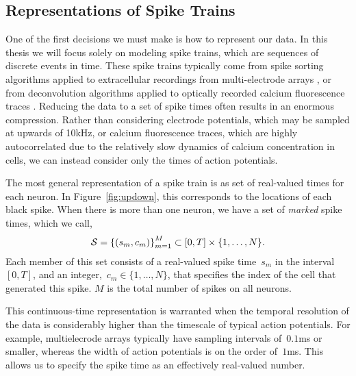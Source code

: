 \subsection{Representations of Spike Trains}
One of the first decisions we must make is how to
represent our data. In this thesis we will focus solely on modeling
spike trains, which are sequences of discrete events in time. These
spike trains typically come from spike sorting algorithms applied to
extracellular recordings from multi-electrode arrays
\citep{lewicki1998review}, or from
deconvolution algorithms applied to optically recorded calcium
fluorescence traces \citep{pnevmatikakis2016simultaneous,
  vogelstein2010fast}. Reducing the data to a set of spike times often 
results in an enormous compression. Rather than considering electrode 
potentials, which may be sampled at upwards of 10kHz, or calcium 
fluorescence traces, which are highly autocorrelated due to the relatively 
slow dynamics of calcium concentration in cells, we can instead consider 
only the times of action potentials.


The most general representation 
of a spike train is as set of real-valued times for each neuron.
In Figure~\ref{fig:updown}, this corresponds to the locations of
each black spike.
When there is more than one neuron, we have a set of
\emph{marked} spike times, which we call,
\begin{align*}
  \mathcal{S} = \left \{ (s_m, c_m) \right \}_{m=1}^M \subset [0, T] \times \{1, \ldots, N\}.
\end{align*}
Each member of this set consists of a real-valued spike time~$s_m$ in
the interval~$[0, T]$, and an integer,~$c_m \in \{1, \ldots, N\}$,
that specifies the index of the cell that generated this spike. $M$ is 
the total number of spikes on all neurons.

This continuous-time representation is
warranted when the temporal resolution of the data is considerably
higher than the timescale of typical action potentials. For example,
multielecrode arrays typically have sampling intervals of~$0.1$ms or
smaller, whereas the width of action potentials is on the order
of~$1$ms. This allows us to specify the spike time as an effectively
real-valued number.  

